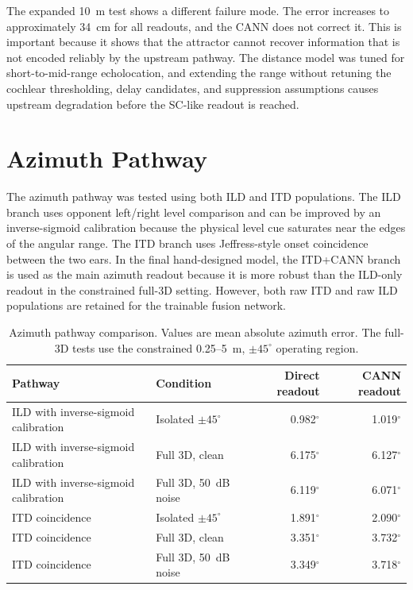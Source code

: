 The expanded 10~m test shows a different failure mode. The error increases to approximately 34~cm for all readouts, and the CANN does not correct it. This is important because it shows that the attractor cannot recover information that is not encoded reliably by the upstream pathway. The distance model was tuned for short-to-mid-range echolocation, and extending the range without retuning the cochlear thresholding, delay candidates, and suppression assumptions causes upstream degradation before the SC-like readout is reached.

\section{Azimuth Pathway}

The azimuth pathway was tested using both ILD and ITD populations. The ILD branch uses opponent left/right level comparison and can be improved by an inverse-sigmoid calibration because the physical level cue saturates near the edges of the angular range. The ITD branch uses Jeffress-style onset coincidence between the two ears. In the final hand-designed model, the ITD+CANN branch is used as the main azimuth readout because it is more robust than the ILD-only readout in the constrained full-3D setting. However, both raw ITD and raw ILD populations are retained for the trainable fusion network.

\begin{table}[H]
    \centering
    \caption{Azimuth pathway comparison. Values are mean absolute azimuth error. The full-3D tests use the constrained 0.25--5~m, $\pm45^\circ$ operating region.}
    \label{tab:azimuth_pathway_results}
    \small
    \begin{tabular}{llrr}
        \toprule
        Pathway & Condition & Direct readout & CANN readout \\
        \midrule
        ILD with inverse-sigmoid calibration & Isolated $\pm45^\circ$ & 0.982$^\circ$ & 1.019$^\circ$ \\
        ILD with inverse-sigmoid calibration & Full 3D, clean & 6.175$^\circ$ & 6.127$^\circ$ \\
        ILD with inverse-sigmoid calibration & Full 3D, 50~dB noise & 6.119$^\circ$ & 6.071$^\circ$ \\
        \midrule
        ITD coincidence & Isolated $\pm45^\circ$ & 1.891$^\circ$ & 2.090$^\circ$ \\
        ITD coincidence & Full 3D, clean & 3.351$^\circ$ & 3.732$^\circ$ \\
        ITD coincidence & Full 3D, 50~dB noise & 3.349$^\circ$ & 3.718$^\circ$ \\
        \bottomrule
    \end{tabular}
\end{table}

